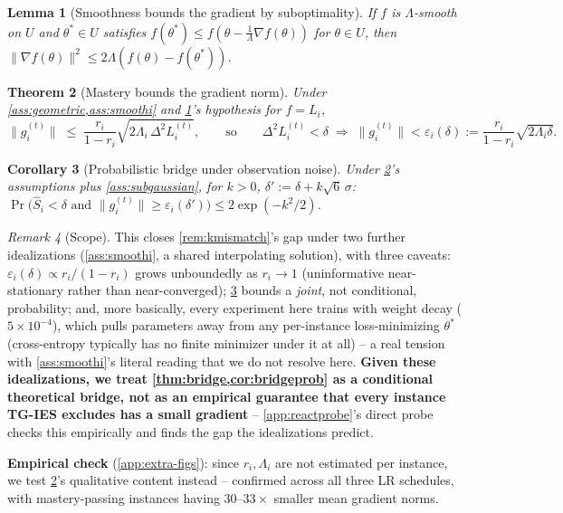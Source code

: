 \documentclass{article}
\theoremstyle{plain}
\newtheorem{theorem}{Theorem}[section]
\newtheorem{lemma}[theorem]{Lemma}
\newtheorem{corollary}[theorem]{Corollary}
\theoremstyle{definition}
\theoremstyle{remark}
\newtheorem{remark}[theorem]{Remark}
\begin{document}
\begin{lemma}[Smoothness bounds the gradient by suboptimality]
\label{lem:descent}
If $f$ is $\Lambda$-smooth on $U$ and $\theta^*\in U$ satisfies $f(\theta^*)\le f(\theta-\tfrac1\Lambda\nabla f(\theta))$ for $\theta\in U$, then $\|\nabla f(\theta)\|^2 \le 2\Lambda(f(\theta)-f(\theta^*))$.
\end{lemma}
\begin{theorem}[Mastery bounds the gradient norm]
\label{thm:bridge}
Under \cref{ass:geometric,ass:smoothi} and \cref{lem:descent}'s hypothesis for $f=L_i$,
\begin{equation}
\label{eq:bridge}
\|g_i^{(t)}\| \;\le\; \frac{r_i}{1-r_i}\sqrt{2\Lambda_i\,\Delta^2 L_i^{(t)}}, \qquad\text{so}\qquad \Delta^2 L_i^{(t)} < \delta \;\Rightarrow\; \|g_i^{(t)}\| < \varepsilon_i(\delta) := \frac{r_i}{1-r_i}\sqrt{2\Lambda_i\delta}.
\end{equation}
\end{theorem}
\begin{corollary}[Probabilistic bridge under observation noise]
\label{cor:bridgeprob}
Under \cref{thm:bridge}'s assumptions plus \cref{ass:subgaussian}, for $k>0$, $\delta':=\delta+k\sqrt6\,\sigma$: $\Pr\big(\hat S_i<\delta \text{ and } \|g_i^{(t)}\|\ge\varepsilon_i(\delta')\big) \le 2\exp(-k^2/2)$.
\end{corollary}
\begin{remark}[Scope]
\label{rem:bridge-scope}
This closes \cref{rem:kmismatch}'s gap under two further idealizations (\cref{ass:smoothi}, a shared interpolating solution), with three caveats: $\varepsilon_i(\delta)\propto r_i/(1-r_i)$ grows unboundedly as $r_i\to1$ (uninformative near-stationary rather than near-converged); \cref{cor:bridgeprob} bounds a \emph{joint}, not conditional, probability; and, more basically, every experiment here trains with weight decay ($5{\times}10^{-4}$), which pulls parameters away from any per-instance loss-minimizing $\theta^*$ (cross-entropy typically has no finite minimizer under it at all) -- a real tension with \cref{ass:smoothi}'s literal reading that we do not resolve here. \textbf{Given these idealizations, we treat \cref{thm:bridge,cor:bridgeprob} as a conditional theoretical bridge, not as an empirical guarantee that every instance TG-IES excludes has a small gradient} -- \cref{app:reactprobe}'s direct probe checks this empirically and finds the gap the idealizations predict.
\end{remark}

\textbf{Empirical check} (\cref{app:extra-figs}): since $r_i,\Lambda_i$ are not estimated per instance, we test \cref{thm:bridge}'s qualitative content instead -- confirmed across all three LR schedules, with mastery-passing instances having $30$--$33\times$ smaller mean gradient norms.
\end{document}
